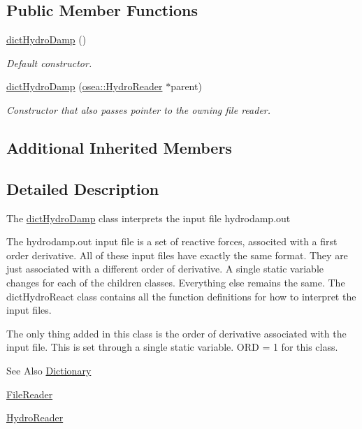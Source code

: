 \subsection*{Public Member Functions}
\begin{DoxyCompactItemize}
\item 
\hyperlink{classosea_1_1dict_hydro_damp_a74cbde0166500326f809477bc9d97f09}{dict\-Hydro\-Damp} ()
\begin{DoxyCompactList}\small\item\em Default constructor. \end{DoxyCompactList}\item 
\hyperlink{classosea_1_1dict_hydro_damp_a5cd7af50227647babb1052155dab4620}{dict\-Hydro\-Damp} (\hyperlink{classosea_1_1_hydro_reader}{osea\-::\-Hydro\-Reader} $\ast$parent)
\begin{DoxyCompactList}\small\item\em Constructor that also passes pointer to the owning file reader. \end{DoxyCompactList}\end{DoxyCompactItemize}
\subsection*{Additional Inherited Members}


\subsection{Detailed Description}
The \hyperlink{classosea_1_1dict_hydro_damp}{dict\-Hydro\-Damp} class interprets the input file hydrodamp.\-out

The hydrodamp.\-out input file is a set of reactive forces, associted with a first order derivative. All of these input files have exactly the same format. They are just associated with a different order of derivative. A single static variable changes for each of the children classes. Everything else remains the same. The dict\-Hydro\-React class contains all the function definitions for how to interpret the input files.

The only thing added in this class is the order of derivative associated with the input file. This is set through a single static variable. O\-R\-D = 1 for this class.

\begin{DoxySeeAlso}{See Also}
\hyperlink{classosea_1_1_dictionary}{Dictionary} 

\hyperlink{classosea_1_1_file_reader}{File\-Reader} 

\hyperlink{classosea_1_1_hydro_reader}{Hydro\-Reader} 
\end{DoxySeeAlso}


